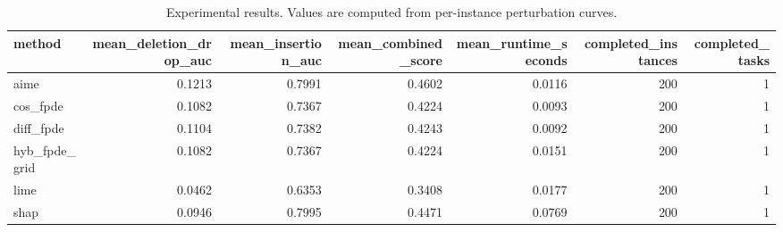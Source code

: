 \begin{table}[t]
\caption{Experimental results. Values are computed from per-instance perturbation curves.}
\label{tab:main_results_computed}
\centering
\begin{tabular}{lrrrrrr}
\toprule
method & mean\_deletion\_drop\_auc & mean\_insertion\_auc & mean\_combined\_score & mean\_runtime\_seconds & completed\_instances & completed\_tasks \\
\midrule
aime & 0.1213 & 0.7991 & 0.4602 & 0.0116 & 200 & 1 \\
cos\_fpde & 0.1082 & 0.7367 & 0.4224 & 0.0093 & 200 & 1 \\
diff\_fpde & 0.1104 & 0.7382 & 0.4243 & 0.0092 & 200 & 1 \\
hyb\_fpde\_grid & 0.1082 & 0.7367 & 0.4224 & 0.0151 & 200 & 1 \\
lime & 0.0462 & 0.6353 & 0.3408 & 0.0177 & 200 & 1 \\
shap & 0.0946 & 0.7995 & 0.4471 & 0.0769 & 200 & 1 \\
\bottomrule
\end{tabular}

\end{table}
